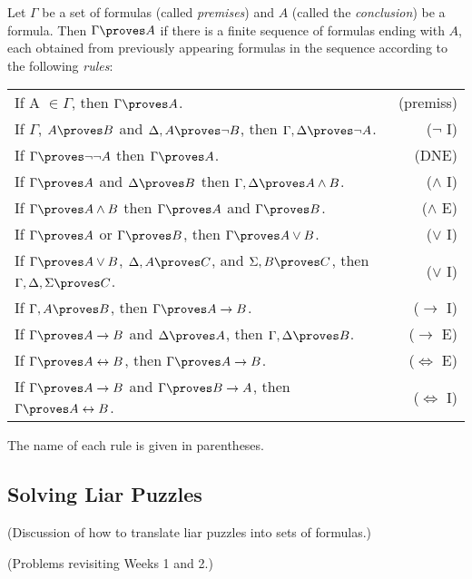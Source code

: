 \documentclass{article}
\begin{document}
\begin{definition}
    Let $\Gamma$ be a set of formulas (called \textit{premises}) and $A$ (called the \textit{conclusion}) be a formula. Then $\Gamma \proves A$ if there is a finite sequence of formulas ending with $A$, each obtained from previously appearing formulas in the sequence according to the following \textit{rules}:
    \begin{center}
    \begin{tabular}{l r}
        If A $\in \Gamma$, then  $\Gamma \proves A$. & (premiss) \\
        If $\Gamma$, $A \proves B$ and $\Delta, A \proves \neg B$, then  $\Gamma, \Delta \proves \neg A$. & ($\neg$ I) \\
        If $\Gamma \proves \neg \neg A$ then $\Gamma \proves A$. & (DNE) \\
        If $\Gamma \proves A$ and $\Delta \proves B$ then $\Gamma, \Delta \proves A \wedge B$. & ($\wedge$ I) \\
        If $\Gamma \proves A \wedge B$ then $\Gamma \proves A$ and $\Gamma \proves B$. & ($\wedge$ E) \\
        If $\Gamma \proves A$ or $\Gamma \proves B$, then $\Gamma \proves A \vee B$. & ($\vee$ I) \\
        If $\Gamma \proves A \vee B$, $\Delta, A \proves C$, and $\Sigma, B \proves C$, then $\Gamma, \Delta, \Sigma \proves C$. & ($\vee$ I) \\
        If $\Gamma, A \proves B$, then $\Gamma \proves A \to B$. & ($\to$ I) \\
        If $\Gamma \proves A \to B$ and $\Delta \proves A$, then $\Gamma, \Delta \proves B$. & ($\to$ E) \\
        If $\Gamma \proves A \iff B$, then $\Gamma \proves A \to B$. & ($\iff$ E) \\
        If $\Gamma \proves A \to B$ and $\Gamma \proves B \to A$, then $\Gamma \proves A \iff B$. & ($\iff$ I)
    \end{tabular}
    \end{center}
\end{definition}

The name of each rule is given in parentheses.

\subsection*{Solving Liar Puzzles}

(Discussion of how to translate liar puzzles into sets of formulas.)

(Problems revisiting Weeks 1 and 2.)
\end{document}
